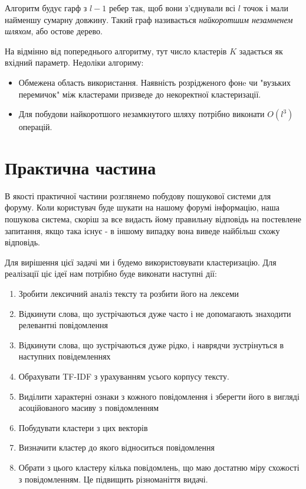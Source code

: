 \documentclass[a4paper,14pt,russian]{extreport}
\begin{document}
		Алгоритм будує гарф з $l- 1$ ребер так, щоб вони з'єднували всі $l$ точок і мали найменшу сумарну довжину. Такий граф називається \textit{найкоротшим незамненем шляхом}, або остове дерево. \par 
		На відмінно від попереднього алгоритму, тут число кластерів $K$ задається як вхідний параметр. 
		Недоліки алгориму:
		\begin{itemize}
		
			\item 	Обмежена область використання.  Наявність розрідженого фонe чи "вузьких перемичок" між кластерами призведе до некоректної кластеризації. 
			
			\item Для побудови найкоротшого незамкнутого шляху потрібно виконати $O(l^3)$ операцій.
		
		
		\end{itemize}
		
		
	 
	 
\chapter{Практична частина}
В якості практичної частини розглянемо побудову пошукової системи для форуму. Коли користувач буде шукати на нашому форумі інформацію, наша пошукова система, скоріш за все видасть йому правильну відповідь на постевлене запитання, якщо така існує - в іншому випадку вона виведе найбільш схожу відповідь.\par 
Для вирішення цієї задачі ми і будемо використовувати кластеризацію. Для реалізації ціє ідеї нам потрібно буде виконати наступні дії:

\begin{enumerate}
\item Зробити лексичний аналіз тексту та розбити його на лексеми
\item Відкинути слова, що зустрічаються дуже часто і не допомагають знаходити релевантні повідомлення
\item Відкинути слова, що зустрічаються дуже рідко, і наврядчи зустрінуться в наступних повідемленнях
\item Обрахувати  TF-IDF з урахуванням усього корпусу тексту.
\item Виділити характерні ознаки з кожного повідомлення і зберегти його в вигляді асоційованого масиву з повідомленням 
\item Побудувати кластери з цих векторів
\item Визначити кластер до якого відноситься повідомлення
\item Обрати з цього кластеру кілька повідомлень, що маю достатню міру схожості з повідомленням. Це підвищить різноманіття видачі.
\end{enumerate}
\end{document}
